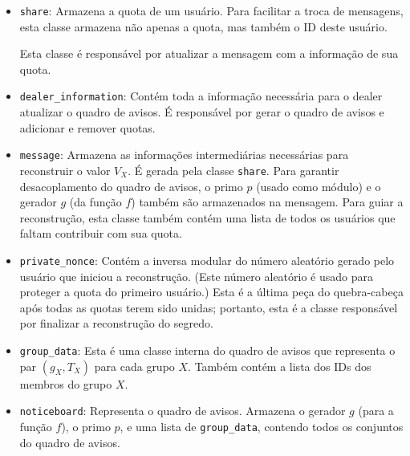 \documentclass[10pt,twocolumn]{article}
\begin{document}
\begin{itemize}
    \item \verb"share":
        Armazena a quota de um usuário.
        Para facilitar a troca de mensagens,
        esta classe armazena não apenas a quota,
        mas também o ID deste usuário.

        Esta classe é responsável por atualizar a mensagem
        com a informação de sua quota.

    \item \verb"dealer_information":
        Contém toda a informação necessária para o dealer atualizar o quadro de avisos.
        É responsável por gerar o quadro de avisos
        e adicionar e remover quotas.

    \item \verb"message":
        Armazena as informações intermediárias necessárias
        para reconstruir o valor $V_X$.
        É gerada pela classe \verb"share".
        Para garantir desacoplamento do quadro de avisos,
        o primo $p$ (usado como módulo)
        e o gerador $g$ (da função $f$)
        também são armazenados na mensagem.
        Para guiar a reconstrução,
        esta classe também contém uma lista de todos os usuários
        que faltam contribuir com sua quota.

    \item \verb"private_nonce":
        Contém a inversa modular
        do número aleatório gerado pelo usuário que iniciou a reconstrução.
        (Este número aleatório é usado para proteger a quota
        do primeiro usuário.)
        Esta é a última peça do quebra-cabeça após todas as quotas terem sido unidas;
        portanto, esta é a classe responsável por finalizar a reconstrução do segredo.
        
    \item \verb"group_data":
        Esta é uma classe interna do quadro de avisos
        que representa o par $(g_X, T_X)$ para cada grupo $X$.
        Também contém a lista dos IDs dos membros do grupo $X$.

    \item \verb"noticeboard":
        Representa o quadro de avisos.
        Armazena o gerador $g$ (para a função $f$),
        o primo $p$,
        e uma lista de \verb"group_data",
        contendo todos os conjuntos do quadro de avisos.
\end{itemize}



\end{document}
